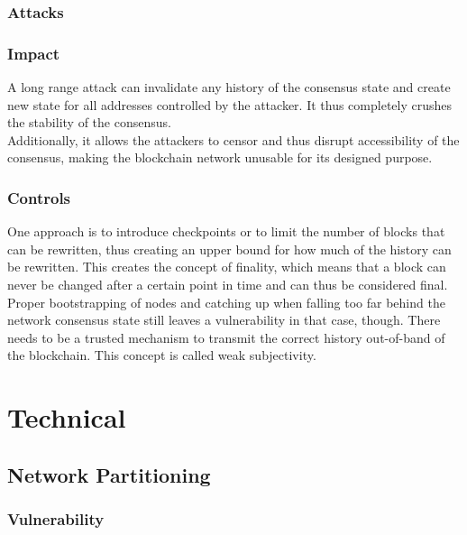 \documentclass[11pt,a4paper,draft]{article}
\begin{document}
\subsubsection{Attacks}

\subsubsection{Impact}

A long range attack can invalidate any history of the consensus state and create new state for all addresses controlled by the attacker. It thus completely crushes the stability of the consensus.\\

Additionally, it allows the attackers to censor and thus disrupt accessibility of the consensus, making the blockchain network unusable for its designed purpose.\\

\subsubsection{Controls}

One approach is to introduce checkpoints or to limit the number of blocks that can be rewritten, thus creating an upper bound for how much of the history can be rewritten. This creates the concept of finality, which means that a block can never be changed after a certain point in time and can thus be considered final.\\

Proper bootstrapping of nodes and catching up when falling too far behind the network consensus state still leaves a vulnerability in that case, though. There needs to be a trusted mechanism to transmit the correct history out-of-band of the blockchain. This concept is called weak subjectivity.\\

\section{Technical}

\subsection{Network Partitioning}

\subsubsection{Vulnerability}
\end{document}
